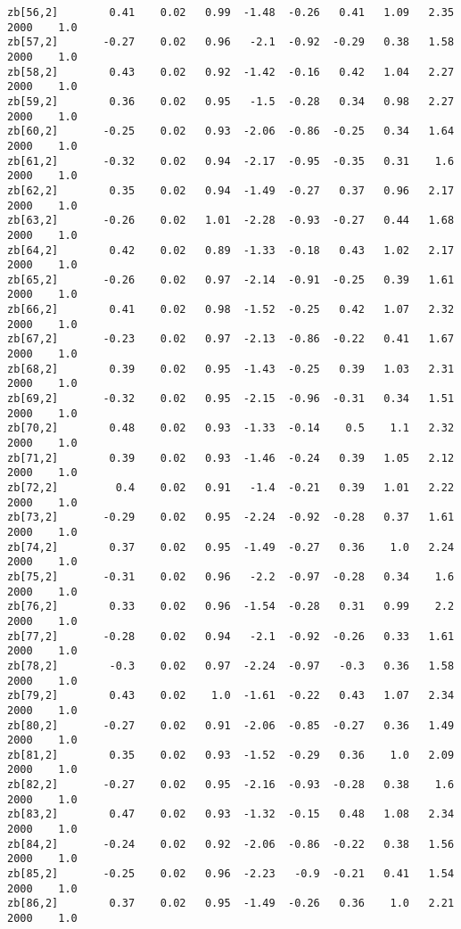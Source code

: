 \documentclass[11pt]{article}
\begin{document}
\begin{Verbatim}[commandchars=\\\{\}]
zb[56,2]        0.41    0.02   0.99  -1.48  -0.26   0.41   1.09   2.35   2000    1.0
zb[57,2]       -0.27    0.02   0.96   -2.1  -0.92  -0.29   0.38   1.58   2000    1.0
zb[58,2]        0.43    0.02   0.92  -1.42  -0.16   0.42   1.04   2.27   2000    1.0
zb[59,2]        0.36    0.02   0.95   -1.5  -0.28   0.34   0.98   2.27   2000    1.0
zb[60,2]       -0.25    0.02   0.93  -2.06  -0.86  -0.25   0.34   1.64   2000    1.0
zb[61,2]       -0.32    0.02   0.94  -2.17  -0.95  -0.35   0.31    1.6   2000    1.0
zb[62,2]        0.35    0.02   0.94  -1.49  -0.27   0.37   0.96   2.17   2000    1.0
zb[63,2]       -0.26    0.02   1.01  -2.28  -0.93  -0.27   0.44   1.68   2000    1.0
zb[64,2]        0.42    0.02   0.89  -1.33  -0.18   0.43   1.02   2.17   2000    1.0
zb[65,2]       -0.26    0.02   0.97  -2.14  -0.91  -0.25   0.39   1.61   2000    1.0
zb[66,2]        0.41    0.02   0.98  -1.52  -0.25   0.42   1.07   2.32   2000    1.0
zb[67,2]       -0.23    0.02   0.97  -2.13  -0.86  -0.22   0.41   1.67   2000    1.0
zb[68,2]        0.39    0.02   0.95  -1.43  -0.25   0.39   1.03   2.31   2000    1.0
zb[69,2]       -0.32    0.02   0.95  -2.15  -0.96  -0.31   0.34   1.51   2000    1.0
zb[70,2]        0.48    0.02   0.93  -1.33  -0.14    0.5    1.1   2.32   2000    1.0
zb[71,2]        0.39    0.02   0.93  -1.46  -0.24   0.39   1.05   2.12   2000    1.0
zb[72,2]         0.4    0.02   0.91   -1.4  -0.21   0.39   1.01   2.22   2000    1.0
zb[73,2]       -0.29    0.02   0.95  -2.24  -0.92  -0.28   0.37   1.61   2000    1.0
zb[74,2]        0.37    0.02   0.95  -1.49  -0.27   0.36    1.0   2.24   2000    1.0
zb[75,2]       -0.31    0.02   0.96   -2.2  -0.97  -0.28   0.34    1.6   2000    1.0
zb[76,2]        0.33    0.02   0.96  -1.54  -0.28   0.31   0.99    2.2   2000    1.0
zb[77,2]       -0.28    0.02   0.94   -2.1  -0.92  -0.26   0.33   1.61   2000    1.0
zb[78,2]        -0.3    0.02   0.97  -2.24  -0.97   -0.3   0.36   1.58   2000    1.0
zb[79,2]        0.43    0.02    1.0  -1.61  -0.22   0.43   1.07   2.34   2000    1.0
zb[80,2]       -0.27    0.02   0.91  -2.06  -0.85  -0.27   0.36   1.49   2000    1.0
zb[81,2]        0.35    0.02   0.93  -1.52  -0.29   0.36    1.0   2.09   2000    1.0
zb[82,2]       -0.27    0.02   0.95  -2.16  -0.93  -0.28   0.38    1.6   2000    1.0
zb[83,2]        0.47    0.02   0.93  -1.32  -0.15   0.48   1.08   2.34   2000    1.0
zb[84,2]       -0.24    0.02   0.92  -2.06  -0.86  -0.22   0.38   1.56   2000    1.0
zb[85,2]       -0.25    0.02   0.96  -2.23   -0.9  -0.21   0.41   1.54   2000    1.0
zb[86,2]        0.37    0.02   0.95  -1.49  -0.26   0.36    1.0   2.21   2000    1.0

\end{Verbatim}
\end{document}
